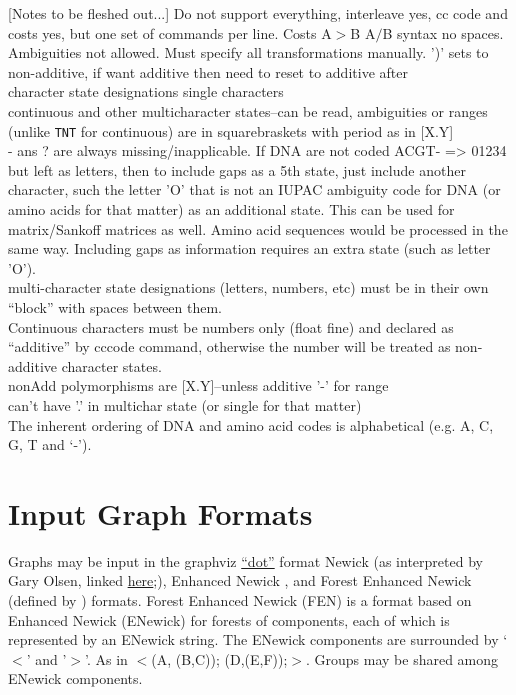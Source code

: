 \documentclass[11pt]{book}
\begin{document}
		[Notes to be fleshed out...]
		Do not support everything, interleave yes, cc code and costs yes, but one set of commands per line.
		Costs A$>$B A$/$B syntax no spaces. Ambiguities not allowed.  Must specify all transformations manually.
		')' sets to non-additive, if want additive then need to reset to additive after\\
		character state designations single characters\\
		continuous and other multicharacter states--can be read, ambiguities or ranges (unlike \texttt{TNT} for continuous) are 
		in squarebraskets with period as in [X.Y]\\
		- ans ? are always missing/inapplicable.  If DNA are not coded ACGT- => 01234 but left as letters,
		then to include gaps as a 5th state, just include another character, such the letter 'O' that is not an IUPAC 
		ambiguity code for DNA (or amino acids for that matter) as an additional state.  This can be used for 
		matrix/Sankoff matrices as well.
		Amino acid sequences would be processed in the same way.  Including gaps as information requires
		an extra state (such as letter 'O').\\ 
		multi-character state designations (letters, numbers, etc) must be in their own ``block'' with spaces 
		between them.\\
		Continuous characters must be numbers only (float fine) and declared as ``additive'' by cccode 
		command, otherwise the number will be treated as non-additive character states. \\
		nonAdd polymorphisms  are [X.Y]--unless  additive '-' for range\\
		can't have '.' in multichar state (or single for that matter)\\
		The inherent ordering of DNA and amino acid codes is alphabetical (e.g. A, C, G, T and `-').
	
\section{Input Graph Formats}
	Graphs may be input in the graphviz \href{https://graphviz.org/}{``dot''} format Newick (as 		
	interpreted by Gary Olsen, linked \href{https://evolution.genetics.washington.edu/phylip/newick_doc.html}
	{here};), Enhanced Newick \cite{Cardonaetal2008}, and Forest Enhanced Newick (defined by 
	\citealp{WheelerPhyloSuperGraphs}) formats.
	Forest Enhanced Newick (FEN) is a format based on Enhanced Newick (ENewick) for 
	forests of components, each of which is represented by an ENewick string.  The ENewick 
	components are surrounded by `$<$' and '$>$'. As in $<$(A, (B,C)); (D,(E,F));$>$.  
	Groups may be shared among ENewick components.
	
\end{document}
